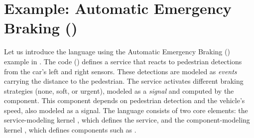 \section{Example: Automatic Emergency Braking (\aeb)}
\label{sec:semantics:example}

Let us introduce the \GRust language using the Automatic Emergency Braking (\aeb) example in
. The code () defines a service
 that reacts to pedestrian detections from the car's left and right sensors. These
detections are modeled as \emph{events} carrying the distance to the pedestrian. The 
service activates different braking strategies (none, soft, or urgent), modeled as a \emph{signal}
 and computed by the  component. This component depends on pedestrian
detection and the vehicle's speed, also modeled as a signal.
%
The \GRust language consists of two core elements: the service-modeling kernel \GRFRP, which defines
the  service, and the component-modeling kernel \GRSync, which defines components such as
.

\def\No{\ttf{None}\xspace}
\def\Soft{\ttf{Soft}\xspace}

